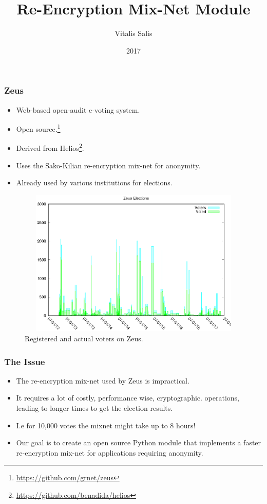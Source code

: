 \documentclass{beamer}
\title{Re-Encryption Mix-Net Module}
\author{Vitalis Salis}
\date{2017}
\begin{document}
    \frame{\titlepage}

    \begin{frame}
        \frametitle{Zeus}
        \begin{itemize}
            \item Web-based open-audit e-voting system.
            \item Open source.\footnote{\url{https://github.com/grnet/zeus}}
            \item Derived from Helios\footnote{
                \url{https://github.com/benadida/helios}
            }.
            \item Uses the Sako-Kilian re-encryption mix-net for anonymity.
            \item Already used by various institutions for elections.
        \end{itemize}
    \end{frame}

    \begin{frame}
        \begin{figure}
            \centering
            \includegraphics[width=12cm,height=7cm,keepaspectratio]{zeus-chart.eps}
            \caption{Registered and actual voters on Zeus.}
        \end{figure}
    \end{frame}

    \begin{frame}
        \frametitle{The Issue}
        \begin{itemize}
            \item The re-encryption mix-net used by Zeus is impractical.
            \item It requires a lot of costly, performance wise, cryptographic.
            operations, leading to longer times to get the election results.
            \item I.e for 10,000 votes the mixnet might take up to 8 hours!
            \item Our goal is to create an open source Python module that
            implements a faster re-encryption mix-net for applications
            requiring anonymity.
        \end{itemize}
    \end{frame}
\end{document}
